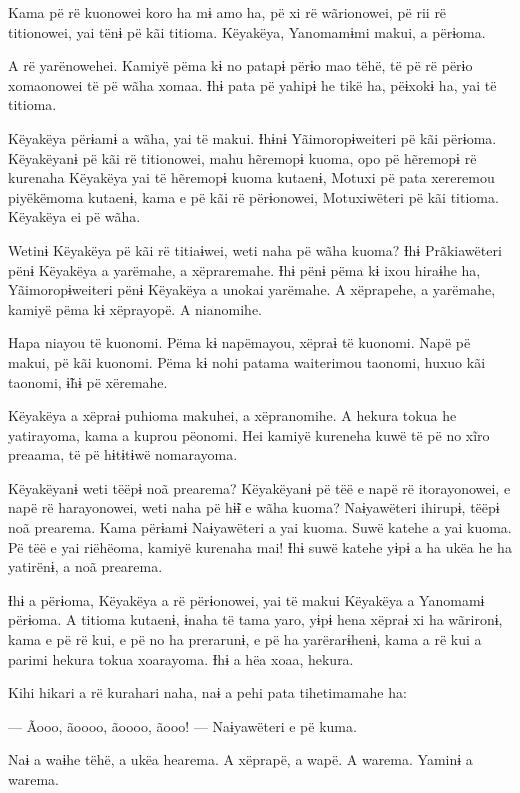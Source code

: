  

Kama pë rë kuonowei koro ha mɨ amo ha, pë xi rë wãrionowei, pë rii rë
titionowei, yai tënɨ pë kãi titioma. Këyakëya, Yanomamɨmi makui, a
përɨoma. 

A rë yarënowehei. Kamiyë pëma kɨ no patapɨ përɨo mao tëhë, të pë rë
përɨo xomaonowei të pë wãha xomaa. Ɨhɨ pata pë yahipɨ he tikë ha,
pëɨxokɨ ha, yai të titioma. 

Këyakëya përɨamɨ a wãha, yai të makui. Ɨhɨnɨ Yãimoropɨweiteri pë kãi
përɨoma. Këyakëyanɨ pë kãi rë titionowei, mahu hẽremopɨ kuoma, opo pë
hẽremopɨ rë kurenaha Këyakëya yai të hẽremopɨ kuoma kutaenɨ, Motuxi pë
pata xereremou piyëkëmoma kutaenɨ, kama e pë kãi rë përɨonowei,
Motuxiwëteri pë kãi titioma. Këyakëya ei pë wãha. 

Wetinɨ Këyakëya pë kãi rë titiaɨwei, weti naha pë wãha kuoma? Ɨhɨ
Prãkiawëteri pënɨ Këyakëya a yarëmahe, a xëpraremahe. Ɨhɨ pënɨ pëma kɨ
ixou hiraɨhe ha, Yãimoropɨweiteri pënɨ Këyakëya a unokai yarëmahe. A xëprapehe, a yarëmahe, kamiyë pëma kɨ xëprayopë. A nianomihe. 

Hapa niayou të kuonomi. Pëma kɨ napëmayou, xëpraɨ të kuonomi. Napë pë
makui, pë kãi kuonomi. Pëma kɨ nohi patama waiterimou taonomi, huxuo kãi
taonomi, ɨ̃hɨ pë xëremahe. 

Këyakëya a xëpraɨ puhioma makuhei, a xëpranomihe. A hekura tokua he
yatirayoma, kama a kuprou pëonomi. Hei kamiyë kureneha kuwë të pë no
xĩro preaama, të pë hɨtɨtɨwë nomarayoma. 

Këyakëyanɨ weti tëëpɨ noã prearema? Këyakëyanɨ pë tëë e napë rë
itorayonowei, e napë rë harayonowei, weti naha pë hɨ̃ɨ e wãha kuoma?
Naɨyawëteri ihirupɨ, tëëpɨ noã prearema. Kama përɨamɨ Naɨyawëteri a yai
kuoma. Suwë katehe a yai kuoma. Pë tëë e yai riëhëoma, kamiyë kurenaha
mai! Ɨhɨ suwë katehe yɨpɨ a ha ukëa he ha yatirënɨ, a noã prearema. 

Ɨhɨ a përɨoma, Këyakëya a rë përɨonowei, yai të makui Këyakëya a
Yanomamɨ përɨoma. A titioma kutaenɨ, ɨnaha të tama yaro, yɨpɨ hena
xëpraɨ xi ha wãrironɨ, kama e pë rë kui, e pë no ha prerarunɨ, e pë ha
yarërarɨhenɨ, kama a rë kui a parimi hekura tokua xoarayoma. Ɨhɨ a hëa
xoaa, hekura. 

Kihi hikari a rë kurahari naha, naɨ a pehi pata tihetimamahe ha:

 

--- Ãooo, ãoooo, ãoooo, ãooo! --- Naɨyawëteri e pë kuma. 

Naɨ a waɨhe tëhë, a ukëa hearema. A xëprapë, a wapë. A warema. Yaminɨ a
warema. 

